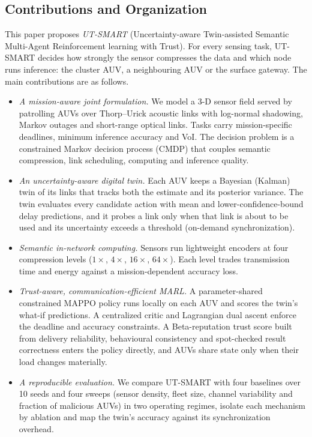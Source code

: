 \documentclass[lettersize,journal]{IEEEtran}
\begin{document}
\subsection{Contributions and Organization}
This paper proposes \emph{UT-SMART} (Uncertainty-aware Twin-assisted Semantic Multi-Agent Reinforcement learning with Trust). For every sensing task, UT-SMART decides how strongly the sensor compresses the data and which node runs inference: the cluster AUV, a neighbouring AUV or the surface gateway. The main contributions are as follows.
\begin{itemize}
\item \emph{A mission-aware joint formulation.} We model a 3-D sensor field served by patrolling AUVs over Thorp--Urick acoustic links with log-normal shadowing, Markov outages and short-range optical links. Tasks carry mission-specific deadlines, minimum inference accuracy and VoI. The decision problem is a constrained Markov decision process (CMDP) that couples semantic compression, link scheduling, computing and inference quality.
\item \emph{An uncertainty-aware digital twin.} Each AUV keeps a Bayesian (Kalman) twin of its links that tracks both the estimate and its posterior variance. The twin evaluates every candidate action with mean and lower-confidence-bound delay predictions, and it probes a link only when that link is about to be used and its uncertainty exceeds a threshold (on-demand synchronization).
\item \emph{Semantic in-network computing.} Sensors run lightweight encoders at four compression levels ($1\times$, $4\times$, $16\times$, $64\times$). Each level trades transmission time and energy against a mission-dependent accuracy loss.
\item \emph{Trust-aware, communication-efficient MARL.} A parameter-shared constrained MAPPO policy runs locally on each AUV and scores the twin's what-if predictions. A centralized critic and Lagrangian dual ascent enforce the deadline and accuracy constraints. A Beta-reputation trust score built from delivery reliability, behavioural consistency and spot-checked result correctness enters the policy directly, and AUVs share state only when their load changes materially.
\item \emph{A reproducible evaluation.} We compare UT-SMART with four baselines over 10 seeds and four sweeps (sensor density, fleet size, channel variability and fraction of malicious AUVs) in two operating regimes, isolate each mechanism by ablation and map the twin's accuracy against its synchronization overhead.
\end{itemize}
\end{document}
